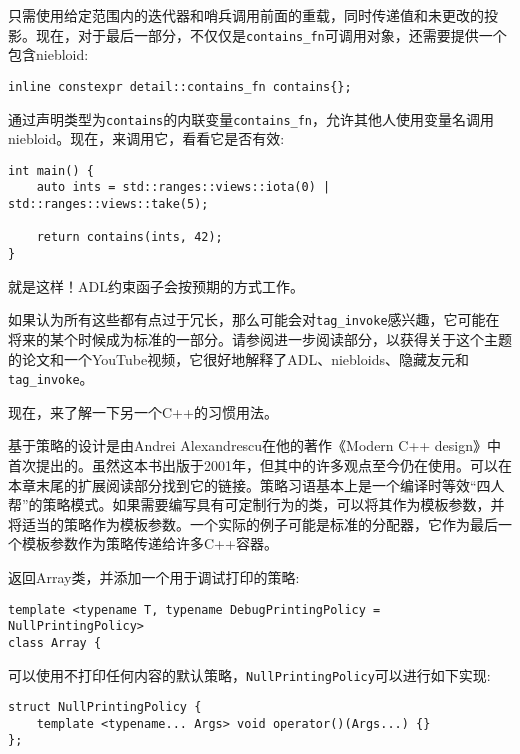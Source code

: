 只需使用给定范围内的迭代器和哨兵调用前面的重载，同时传递值和未更改的投影。现在，对于最后一部分，不仅仅是\texttt{contains\_fn}可调用对象，还需要提供一个包含niebloid:

\begin{lstlisting}[style=styleCXX]
inline constexpr detail::contains_fn contains{};
\end{lstlisting}

通过声明类型为\texttt{contains}的内联变量\texttt{contains\_fn}，允许其他人使用变量名调用niebloid。现在，来调用它，看看它是否有效:

\begin{lstlisting}[style=styleCXX]
int main() {
	auto ints = std::ranges::views::iota(0) | std::ranges::views::take(5);
	
	return contains(ints, 42);
}
\end{lstlisting}

就是这样！ADL约束函子会按预期的方式工作。

如果认为所有这些都有点过于冗长，那么可能会对\texttt{tag\_invoke}感兴趣，它可能在将来的某个时候成为标准的一部分。请参阅进一步阅读部分，以获得关于这个主题的论文和一个YouTube视频，它很好地解释了ADL、niebloids、隐藏友元和\texttt{tag\_invoke}。

现在，来了解一下另一个C++的习惯用法。


基于策略的设计是由Andrei Alexandrescu在他的著作《Modern C++ design》中首次提出的。虽然这本书出版于2001年，但其中的许多观点至今仍在使用。可以在本章末尾的扩展阅读部分找到它的链接。策略习语基本上是一个编译时等效“四人帮”的策略模式。如果需要编写具有可定制行为的类，可以将其作为模板参数，并将适当的策略作为模板参数。一个实际的例子可能是标准的分配器，它作为最后一个模板参数作为策略传递给许多C++容器。

返回Array类，并添加一个用于调试打印的策略:

\begin{lstlisting}[style=styleCXX]
template <typename T, typename DebugPrintingPolicy = NullPrintingPolicy>
class Array {
\end{lstlisting}

可以使用不打印任何内容的默认策略，\texttt{NullPrintingPolicy}可以进行如下实现:

\begin{lstlisting}[style=styleCXX]
struct NullPrintingPolicy {
	template <typename... Args> void operator()(Args...) {}
};
\end{lstlisting}

